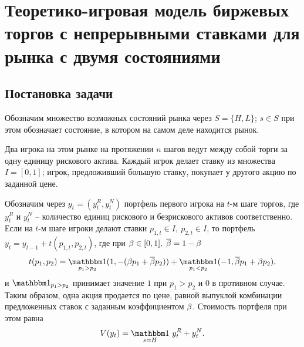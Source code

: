 \chapter{Теоретико-игровая модель биржевых торгов с непрерывными ставками для
  рынка с двумя состояниями} \label{chapt2}%
\newcommand{\Port}[1]{y_{#1}}%
%
\newcommand*\dualFPS{\ensuremath{(P, \; \sigma)}}%
\dualg[4][1=n, 2={\dualFPS}, 3=x, 4=\tau]{%
  \ensuremath{g^*_{#1}(#3, #2, #4)}%
}%
\newcommand*\dom{\ensuremath{\mathrm{dom\;}} }%
\newcommand*\range{\ensuremath{\mathrm{range\;}}}%
%


\section{Постановка задачи}
Обозначим множество возможных состояний рынка через $S = \{H, L\}$; $s \in S$
при этом обозначает состояние, в котором на самом деле находится рынок.

Два игрока на этом рынке на протяжении $n$ шагов ведут между собой торги за одну
единицу рискового актива. Каждый игрок делает ставку из множества $I = [0, 1]$;
игрок, предложивший большую ставку, покупает у другого акцию по заданной цене.

Обозначим через $\Port{t} = (\Port{t}^R, \Port{t}^N)$ портфель первого игрока на
$t$-м шаге торгов, где $\Port{t}^R$ и $\Port{t}^N$ -- количество единиц
рискового и безрискового активов соответственно. Если на $t$-м шаге игроки
делают ставки $p_{1,t} \in I, \: p_{2,t} \in I$, то портфель $\Port{t} =
\Port{t-1} + t(p_{1,t}, p_{2,t})$, где при $\beta \in [0, 1], \; {\overline{\beta}} = 1 - \beta$
\begin{equation}\label{eq:trans-mechanism}
  t(p_1, p_2) = \Ind_{p_1 > p_2} (1, -(\Co p_1 + \DCo p_2)) +
  \Ind_{p_1 < p_2} (-1, \DCo p_1 + \Co p_2),
\end{equation}
и $\Ind_{p_1 > p_2}$ принимает значение $1$ при $p_1 > p_2$ и $0$ в противном
случае. Таким образом, одна акция продается по цене, равной выпуклой комбинации
предложенных ставок с заданным коэффициентом $\beta$. Стоимость портфеля при этом
равна
\begin{equation*}
  V(\Port{t})=\Ind_{s = H} \, \Port{t}^R + \Port{t}^N.
\end{equation*}

